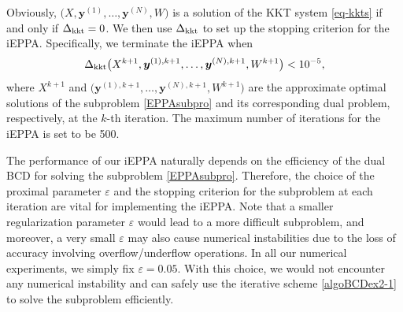 \documentclass[10pt]{article}
\newcommand{\blue}[1]{\begin{color}{blue}#1\end{color}}
\newcommand{\inprod}[2]{\langle #1 , #2 \rangle }
\def\inprod#1#2{\langle#1,\,#2\rangle}
\begin{document}
Obviously,  $ \big(X,\bm{y}^{(1)},\dots,\bm{y}^{(N)},W \big) $ is a solution of the KKT system \eqref{eq-kkts} if and only if $\Delta_{\rm kkt} = 0$.
We then use $\Delta_{\rm kkt}$ to set up the stopping criterion for the iEPPA. Specifically, we terminate the iEPPA when
\begin{equation*}
\Delta_{\rm kkt}\big(X^{k+1},\bm{y}^{(1),k+1},\dots,\bm{y}^{(N),k+1},W^{k+1} \big) < 10^{-5},
\end{equation*}
where $X^{k+1}$ and $\big(\bm{y}^{(1),k+1},\dots,\bm{y}^{(N),k+1},W^{k+1} \big)$ are the approximate optimal solutions of the subproblem \eqref{EPPAsubpro} and its corresponding dual problem, respectively, at the $k$-th iteration. The maximum number of iterations for the iEPPA is set to be 500.

The performance of our iEPPA naturally depends on the efficiency of the dual BCD for solving the subproblem \eqref{EPPAsubpro}. Therefore, the choice of the proximal parameter $\varepsilon$ and the stopping criterion for the subproblem at each iteration are vital for implementing the iEPPA. Note that a smaller regularization parameter $\varepsilon$ would lead to a more difficult subproblem, and moreover, a very small $\varepsilon$ may also cause numerical instabilities due to the loss of accuracy involving overflow/underflow operations.
In all our numerical experiments, we simply fix $\varepsilon=0.05$. With this choice, we would not encounter any numerical instability and can safely use the iterative scheme \eqref{algoBCDex2-1} to solve the subproblem efficiently.
\end{document}
